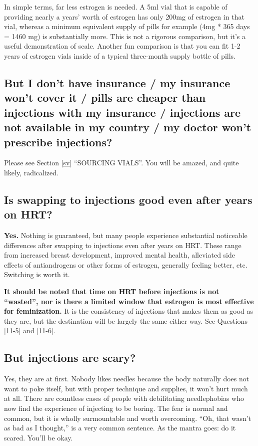 \documentclass{article}
\begin{document}
In simple terms, far less estrogen is needed. A 5ml vial that is capable of providing nearly a years’ worth of estrogen has only 200mg of estrogen in that vial, whereas a minimum equivalent supply of pills for example (4mg * 365 days = 1460 mg) is substantially more. This is not a rigorous comparison, but it’s a useful demonstration of scale. Another fun comparison is that you can fit 1-2 years of estrogen vials inside of a typical three-month supply bottle of pills.

\subsection{But I don’t have insurance / my insurance won’t cover it / pills are cheaper than injections with my insurance / injections are not available in my country / my doctor won’t prescribe injections?}

Please see Section \ref{sv} “SOURCING VIALS”. You will be amazed, and quite likely, radicalized.

\subsection{Is swapping to injections good even after years on HRT?}

\textbf{Yes.} Nothing is guaranteed, but many people experience substantial noticeable differences after swapping to injections even after years on HRT. These range from increased breast development, improved mental health, alleviated side effects of antiandrogens or other forms of estrogen, generally feeling better, etc. Switching is worth it.

\textbf{It should be noted that time on HRT before injections is not “wasted”, nor is there a limited window that estrogen is most effective for feminization.} It is the consistency of injections that makes them as good as they are, but the destination will be largely the same either way. See Questions \ref{11-5} and \ref{11-6}.

\subsection{But injections are scary?}

Yes, they are at first. Nobody likes needles because the body naturally does not want to poke itself, but with proper technique and supplies, it won’t hurt much at all. There are countless cases of people with debilitating needlephobias who now find the experience of injecting to be boring. The fear is normal and common, but it is wholly surmountable and worth overcoming. “Oh, that wasn’t as bad as I thought,” is a very common sentence. As the mantra goes: do it scared. You’ll be okay.
\end{document}
